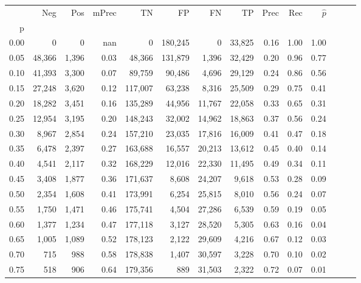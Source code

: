 \begin{tabular}{rrrrrrrrrrrrrr}
\toprule
{} &     Neg &    Pos & mPrec &       TN &       FP &      FN &      TP &  Prec &   Rec & $\hat{p}$ \\
p    &         &        &       &          &          &         &         &       &       &           \\
\midrule
0.00 &       0 &      0 &   nan &        0 &  180,245 &       0 &  33,825 &  0.16 &  1.00 &      1.00 \\
0.05 &  48,366 &  1,396 &  0.03 &   48,366 &  131,879 &   1,396 &  32,429 &  0.20 &  0.96 &      0.77 \\
0.10 &  41,393 &  3,300 &  0.07 &   89,759 &   90,486 &   4,696 &  29,129 &  0.24 &  0.86 &      0.56 \\
0.15 &  27,248 &  3,620 &  0.12 &  117,007 &   63,238 &   8,316 &  25,509 &  0.29 &  0.75 &      0.41 \\
0.20 &  18,282 &  3,451 &  0.16 &  135,289 &   44,956 &  11,767 &  22,058 &  0.33 &  0.65 &      0.31 \\
0.25 &  12,954 &  3,195 &  0.20 &  148,243 &   32,002 &  14,962 &  18,863 &  0.37 &  0.56 &      0.24 \\
0.30 &   8,967 &  2,854 &  0.24 &  157,210 &   23,035 &  17,816 &  16,009 &  0.41 &  0.47 &      0.18 \\
0.35 &   6,478 &  2,397 &  0.27 &  163,688 &   16,557 &  20,213 &  13,612 &  0.45 &  0.40 &      0.14 \\
0.40 &   4,541 &  2,117 &  0.32 &  168,229 &   12,016 &  22,330 &  11,495 &  0.49 &  0.34 &      0.11 \\
0.45 &   3,408 &  1,877 &  0.36 &  171,637 &    8,608 &  24,207 &   9,618 &  0.53 &  0.28 &      0.09 \\
0.50 &   2,354 &  1,608 &  0.41 &  173,991 &    6,254 &  25,815 &   8,010 &  0.56 &  0.24 &      0.07 \\
0.55 &   1,750 &  1,471 &  0.46 &  175,741 &    4,504 &  27,286 &   6,539 &  0.59 &  0.19 &      0.05 \\
0.60 &   1,377 &  1,234 &  0.47 &  177,118 &    3,127 &  28,520 &   5,305 &  0.63 &  0.16 &      0.04 \\
0.65 &   1,005 &  1,089 &  0.52 &  178,123 &    2,122 &  29,609 &   4,216 &  0.67 &  0.12 &      0.03 \\
0.70 &     715 &    988 &  0.58 &  178,838 &    1,407 &  30,597 &   3,228 &  0.70 &  0.10 &      0.02 \\
0.75 &     518 &    906 &  0.64 &  179,356 &      889 &  31,503 &   2,322 &  0.72 &  0.07 &      0.01 \\

\end{tabular}
